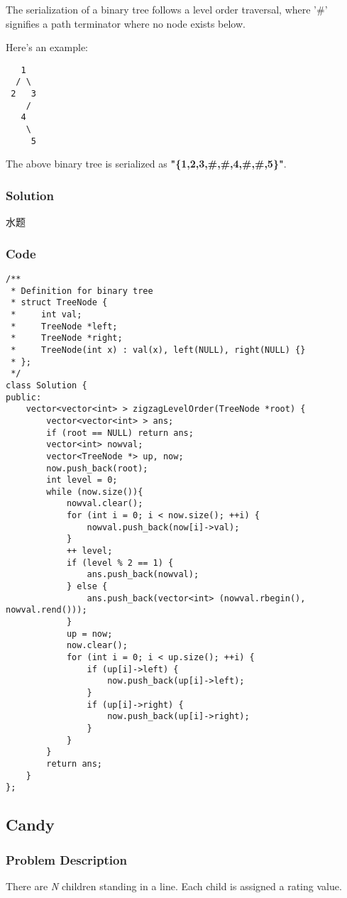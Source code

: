\documentclass[courier]{article}
\begin{document}
\begin{CJK*}{UTF8}{gkai}
The serialization of a binary tree follows a level order traversal, where '\#' signifies a path terminator where no node exists below.

Here's an example:


\begin{verbatim}
   1
  / \
 2   3
    /
   4
    \
     5
\end{verbatim}
The above binary tree is serialized as \textbf{"\{1,2,3,\#,\#,4,\#,\#,5\}"}.



\subsubsection*{Solution}
水题

\subsubsection*{Code}
\begin{lstlisting}
/**
 * Definition for binary tree
 * struct TreeNode {
 *     int val;
 *     TreeNode *left;
 *     TreeNode *right;
 *     TreeNode(int x) : val(x), left(NULL), right(NULL) {}
 * };
 */
class Solution {
public:
    vector<vector<int> > zigzagLevelOrder(TreeNode *root) {
        vector<vector<int> > ans;
        if (root == NULL) return ans;
        vector<int> nowval;
        vector<TreeNode *> up, now;
        now.push_back(root);
        int level = 0;
        while (now.size()){
            nowval.clear();
            for (int i = 0; i < now.size(); ++i) {
                nowval.push_back(now[i]->val);
            }
            ++ level;
            if (level % 2 == 1) {
                ans.push_back(nowval);
            } else {
                ans.push_back(vector<int> (nowval.rbegin(), nowval.rend()));
            }
            up = now;
            now.clear();
            for (int i = 0; i < up.size(); ++i) {
                if (up[i]->left) {
                    now.push_back(up[i]->left);
                }
                if (up[i]->right) {
                    now.push_back(up[i]->right);
                }
            }
        }
        return ans;
    }
}; 
\end{lstlisting}


\subsection{ Candy }

\subsubsection*{Problem Description}
There are \emph{N} children standing in a line. Each child is assigned a rating value.


\end{CJK*}
\end{document}
